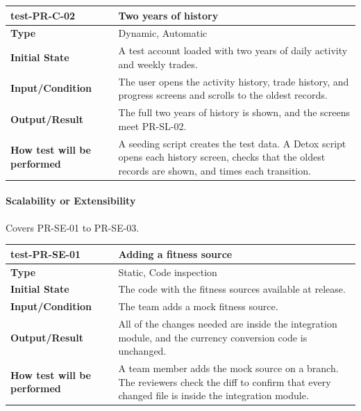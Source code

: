 \documentclass[12pt, titlepage]{article}
\begin{document}
\vspace{1em}

\noindent\begin{tabularx}{\textwidth}{>{\raggedright\arraybackslash}p{3.5cm}X}
  \toprule
  \textbf{test-PR-C-02} & \textbf{Two years of history}\\
  \midrule
  \textbf{Type} & Dynamic, Automatic\\
  \textbf{Initial State} & A test account loaded with two years of daily activity and weekly trades.\\
  \textbf{Input/Condition} & The user opens the activity history, trade history, and progress screens and scrolls to the oldest records.\\
  \textbf{Output/Result} & The full two years of history is shown, and the screens meet PR-SL-02.\\
  \textbf{How test will be performed} & A seeding script creates the test data. A Detox script opens each history screen, checks that the oldest records are shown, and times each transition.\\
  \bottomrule
\end{tabularx}

\paragraph{Scalability or Extensibility}

Covers PR-SE-01 to PR-SE-03.

\noindent\begin{tabularx}{\textwidth}{>{\raggedright\arraybackslash}p{3.5cm}X}
  \toprule
  \textbf{test-PR-SE-01} & \textbf{Adding a fitness source}\\
  \midrule
  \textbf{Type} & Static, Code inspection\\
  \textbf{Initial State} & The code with the fitness sources available at release.\\
  \textbf{Input/Condition} & The team adds a mock fitness source.\\
  \textbf{Output/Result} & All of the changes needed are inside the integration module, and the currency conversion code is unchanged.\\
  \textbf{How test will be performed} & A team member adds the mock source on a branch. The reviewers check the diff to confirm that every changed file is inside the integration module.\\
  \bottomrule
\end{tabularx}
\end{document}
